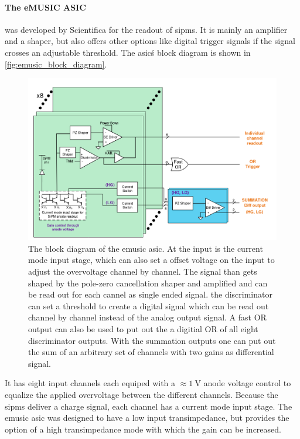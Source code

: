 \paragraph{The eMUSIC ASIC} was developed by Scientifica for the readout of \acp{sipm}.
It is mainly an amplifier and a shaper, but also offers other options like digital trigger signals if the signal crosses an adjustable threshold.
The \ac{asic}\'s block diagram is shown in \autoref{fig:emusic_block_diagram}.
\begin{figure}
	\centering
	\includegraphics[width=1.\textwidth]{pictures/emusic_block_diagram.png}
	\caption[eMUSIC block diagram]{The block diagram of the \ac{emusic} \ac{asic}. At the input is the current mode input stage, which can also set a offset voltage on the input to adjust the overvoltage channel by channel. The signal than gets shaped by the pole-zero cancellation shaper and amplified and can be read out for each cannel as single ended signal. the discriminator can set a threshold to create a digital signal which can be read out channel by channel instead of the analog output signal. A fast OR output can also be used to put out the a digitial OR of all eight discriminator outputs. With the summation outputs one can put out the sum of an arbitrary set of channels with two gains as differential signal. \cite{gomez}}
	\label{fig:emusic_block_diagram}
\end{figure}
It has eight input channels each equiped with a $\approx\SI{1}{\volt}$ anode voltage control to equalize the applied overvoltage between the different channels.
Because the \acp{sipm} deliver a charge signal, each channel has a current mode input stage.
The \ac{emusic} \ac{asic} was designed to have a low input transimpedance, but provides the option of a high transimpedance mode with which the gain can be increased.
